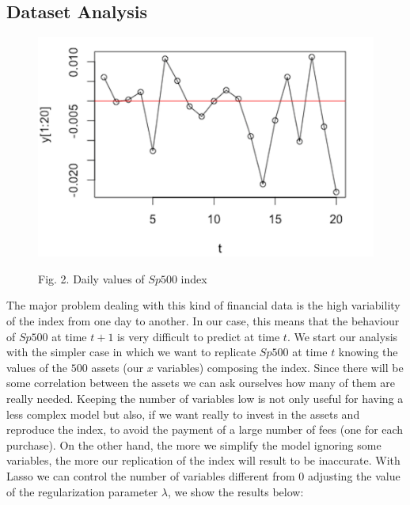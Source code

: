 \documentclass{article}%
\begin{document}
\subsection{Dataset Analysis}
\begin{figure}[h!!!]
  \centering
  \includegraphics[scale=0.6]{daily_var.png}
  
\begin{center}
\begin{small}
Fig. 2. Daily values of $Sp500$ index
\end{small}
\end{center}

  \label{daily_var}
\end{figure}

The major problem dealing with this kind of financial data is the high variability of the index from one day to another. In our case, this means that the behaviour of  $Sp500$ at time $t+1$ is very difficult to predict at time $t$.
We start our analysis with the simpler case in which we want to replicate $Sp500$ at time $t$ knowing the values of the $500$ assets (our $x$ variables) composing the index. Since there will be some correlation between the assets we can ask ourselves how many of them are really needed. Keeping the number of variables low is not only useful for having a less complex model but also, if we want really to invest in the assets and reproduce the index, to avoid the payment of a large number of fees (one for each purchase). On the other hand, the more we simplify the model ignoring some variables, the more our replication of the index will result to be inaccurate. With Lasso we can control the number of variables different from $0$ adjusting the value of the regularization parameter $\lambda$, we show the results below: 
\end{document}
